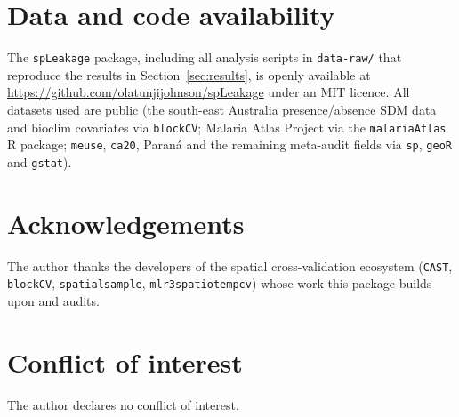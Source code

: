 \documentclass[11pt,a4paper]{article}
\begin{document}
\section*{Data and code availability}
The \texttt{spLeakage} package, including all analysis scripts in
\texttt{data-raw/} that reproduce the results in Section~\ref{sec:results}, is
openly available at \url{https://github.com/olatunjijohnson/spLeakage} under an MIT
licence. All datasets used are public (the south-east Australia presence/absence SDM
data and bioclim covariates via \texttt{blockCV}; Malaria Atlas Project via the
\texttt{malariaAtlas} R package; \texttt{meuse}, \texttt{ca20}, Paran\'a and the
remaining meta-audit fields via \texttt{sp}, \texttt{geoR} and \texttt{gstat}).

\section*{Acknowledgements}
The author thanks the developers of the spatial cross-validation ecosystem
(\texttt{CAST}, \texttt{blockCV}, \texttt{spatialsample},
\texttt{mlr3spatiotempcv}) whose work this package builds upon and audits.

\section*{Conflict of interest}
The author declares no conflict of interest.


\end{document}
